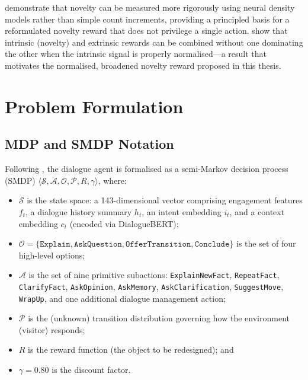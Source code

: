 \documentclass[12pt,a4paper]{article}
\begin{document}
\citet{ostrovski2017} demonstrate that novelty can be measured more rigorously using neural density models rather than simple count increments, providing a principled basis for a reformulated novelty reward that does not privilege a single action. \citet{burda2018} show that intrinsic (novelty) and extrinsic rewards can be combined without one dominating the other when the intrinsic signal is properly normalised---a result that motivates the normalised, broadened novelty reward proposed in this thesis.

\section{Problem Formulation}
\label{sec:problem}

\subsection{MDP and SMDP Notation}

Following \citet{bourdon2025}, the dialogue agent is formalised as a semi-Markov decision process (SMDP) $\langle \mathcal{S}, \mathcal{A}, \mathcal{O}, \mathcal{P}, R, \gamma \rangle$, where:
\begin{itemize}[nosep]
    \item $\mathcal{S}$ is the state space: a 143-dimensional vector comprising engagement features $f_t$, a dialogue history summary $h_t$, an intent embedding $i_t$, and a context embedding $c_t$ (encoded via DialogueBERT);
    \item $\mathcal{O} = \{\texttt{Explain}, \texttt{AskQuestion}, \texttt{OfferTransition}, \texttt{Conclude}\}$ is the set of four high-level options;
    \item $\mathcal{A}$ is the set of nine primitive subactions: \texttt{ExplainNewFact}, \texttt{RepeatFact}, \texttt{ClarifyFact}, \texttt{AskOpinion}, \texttt{AskMemory}, \texttt{AskClarification}, \texttt{SuggestMove}, \texttt{WrapUp}, and one additional dialogue management action;
    \item $\mathcal{P}$ is the (unknown) transition distribution governing how the environment (visitor) responds;
    \item $R$ is the reward function (the object to be redesigned); and
    \item $\gamma = 0.80$ is the discount factor.
\end{itemize}
\end{document}
